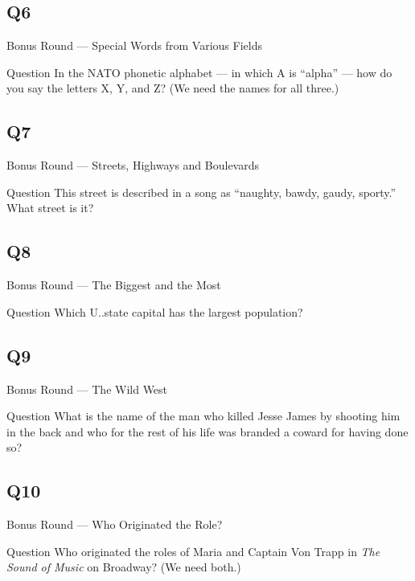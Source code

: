 \documentclass[11pt]{beamer}
\begin{document}
\subsection*{Q6}
\begin{frame}[t]{Bonus Round --- Special Words from Various Fields}
\vspace{-0.5em}
\begin{block}{Question}
In the NATO phonetic alphabet --- in which A is ``alpha'' --- how do you say the letters X, Y, and Z\@? (We need the names for all three.)
\end{block}
\end{frame}
\subsection*{Q7}
\begin{frame}[t]{Bonus Round --- Streets, Highways and Boulevards}
\vspace{-0.5em}
\begin{block}{Question}
This street is described in a song as ``naughty, bawdy, gaudy, sporty.'' What street is it?
\end{block}
\end{frame}
\subsection*{Q8}
\begin{frame}[t]{Bonus Round --- The Biggest and the Most}
\vspace{-0.5em}
\begin{block}{Question}
Which U.\@S.\@ state capital has the largest population?
\end{block}
\end{frame}
\subsection*{Q9}
\begin{frame}[t]{Bonus Round --- The Wild West}
\vspace{-0.5em}
\begin{block}{Question}
What is the name of the man who killed Jesse James by shooting him in the back and who for the rest of his life was branded a coward for having done so?
\end{block}
\end{frame}
\subsection*{Q10}
\begin{frame}[t]{Bonus Round --- Who Originated the Role?}
\vspace{-0.5em}
\begin{block}{Question}
Who originated the roles of Maria and Captain Von Trapp in \emph{The Sound of Music} on Broadway? (We need both.)
\end{block}
\end{frame}
\end{document}

